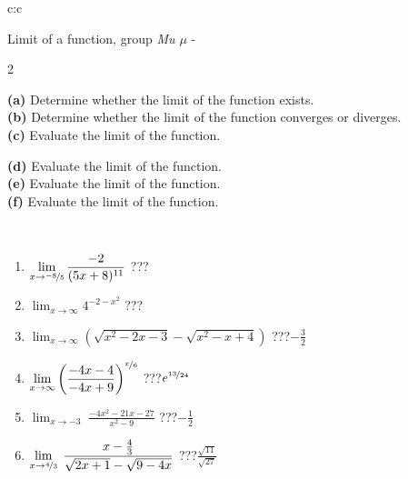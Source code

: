 \documentclass[10pt]{report}
\begin{document}
\newpage
\thispagestyle{empty}
\begin{tabular}{c:c}
\begin{minipage}[c][104.5mm][t]{0.5\linewidth}
\begin{center}
\vspace{5mm}
{\huge Limit of a function, group \textit{Mu $\mu$} -}\\[5mm]
\begin{minipage}{0.95\linewidth}
\begin{center}
{\small \begin{multicols}{2} \raggedright
\textbf{(a)} Determine whether the limit of the function exists. \\[1mm]
\textbf{(b)} Determine whether the limit of the function converges or diverges. \\[1mm]
\textbf{(c)} Evaluate the limit of the function. \par \columnbreak
\textbf{(d)} Evaluate the limit of the function. \\[1mm]
\textbf{(e)} Evaluate the limit of the function. \\[1mm]
\textbf{(f)} Evaluate the limit of the function. \\[1mm]
\end{multicols}
}
\end{center}
\end{minipage}
\\[1mm]
\begin{minipage}{0.79\linewidth}
\begin{center}
\begin{varwidth}{\linewidth}
\setlength{\itemsep}{0pt}
\begin{enumerate}
\normalsize
\item $\displaystyle\lim_{x\to\nicefrac{-8}{5}}{\frac{-2}{(5x+8)^{11}}}$\quad \dotfill\; ???\;\dotfill \quad {}
\item $\displaystyle\lim_{x\to\infty}{4^{-2-x^2}}$\quad \dotfill\; ???\;\dotfill \quad {}
\item $\displaystyle\lim_{x\to\infty}{\left(\sqrt{x^2-2x-3} - \sqrt{x^2-x+4}\right)}$\quad \dotfill\; ???\;\dotfill \quad $-\frac{3}{2}$
\item $\displaystyle\lim_{x\to\infty}{\left( \frac{-4x-4}{-4x+9} \right)^{\nicefrac{x}{6}}}$\quad \dotfill\; ???\;\dotfill \quad $e^{\nicefrac{13}{24}}$
\item $\displaystyle\lim_{x\to -3}{\;\frac{-4x^2-21x-27}{x^2-9}}$\quad \dotfill\; ???\;\dotfill \quad $-\frac{1}{2}$
\item $\displaystyle\lim_{x\to \nicefrac{4}{3}}{\;\frac{x-\frac{4}{3}}{\sqrt{2x+1} - \sqrt{9-4x}}}$\quad \dotfill\; ???\;\dotfill \quad $\frac{\sqrt{11}}{\sqrt{27}}$

\end{enumerate}
\end{varwidth}
\end{center}
\end{minipage}
\end{center}
\end{minipage}
\end{tabular}
\end{document}
